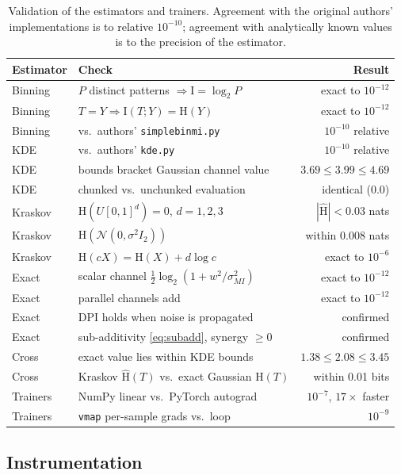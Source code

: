 \documentclass[11pt,a4paper]{article}
\newcommand{\I}{\mathrm{I}}
\newcommand{\HH}{\mathrm{H}}
\newcommand{\Norm}{\mathcal{N}}
\newcommand{\smi}{\sigma_{MI}}
\begin{document}
\begin{table}[t]
\centering
\small
\begin{tabular}{llr}
\toprule
\textbf{Estimator} & \textbf{Check} & \textbf{Result} \\
\midrule
Binning  & $P$ distinct patterns $\Rightarrow \I=\log_2 P$ & exact to $10^{-12}$ \\
Binning  & $T=Y \Rightarrow \I(T;Y)=\HH(Y)$ & exact to $10^{-12}$ \\
Binning  & vs.\ authors' \texttt{simplebinmi.py} & $10^{-10}$ relative \\
KDE      & vs.\ authors' \texttt{kde.py} & $10^{-10}$ relative \\
KDE      & bounds bracket Gaussian channel value & $3.69 \le 3.99 \le 4.69$ \\
KDE      & chunked vs.\ unchunked evaluation & identical (0.0) \\
Kraskov  & $\HH(U[0,1]^d)=0$, $d=1,2,3$ & $|\hat{\HH}| < 0.03$ nats \\
Kraskov  & $\HH(\Norm(0,\sigma^2I_2))$ & within 0.008 nats \\
Kraskov  & $\HH(cX)=\HH(X)+d\log c$ & exact to $10^{-6}$ \\
Exact    & scalar channel $\tfrac12\log_2(1+w^2/\smi^2)$ & exact to $10^{-12}$ \\
Exact    & parallel channels add & exact to $10^{-12}$ \\
Exact    & DPI holds when noise is propagated & confirmed \\
Exact    & sub-additivity \eqref{eq:subadd}, synergy $\ge 0$ & confirmed \\
Cross    & exact value lies within KDE bounds & $1.38 \le 2.08 \le 3.45$ \\
Cross    & Kraskov $\hat{\HH}(T)$ vs.\ exact Gaussian $\HH(T)$ & within 0.01 bits \\
Trainers & NumPy linear vs.\ PyTorch autograd & $10^{-7}$, $17\times$ faster \\
Trainers & \texttt{vmap} per-sample grads vs.\ loop & $10^{-9}$ \\
\bottomrule
\end{tabular}
\caption{Validation of the estimators and trainers. Agreement with the original
authors' implementations is to relative $10^{-10}$; agreement with analytically
known values is to the precision of the estimator.}
\label{tab:validation}
\end{table}

\subsection{Instrumentation}
\end{document}
